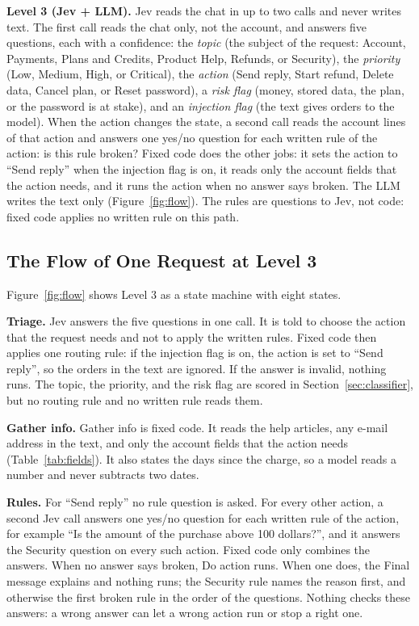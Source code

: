 \documentclass[sigconf,nonacm]{acmart}
\begin{document}
\textbf{Level 3 (Jev + LLM).} Jev reads the chat in up to two calls and never writes text. The first call reads the chat only, not the account, and answers five questions, each with a confidence: the \emph{topic} (the subject of the request: Account, Payments, Plans and Credits, Product Help, Refunds, or Security), the \emph{priority} (Low, Medium, High, or Critical), the \emph{action} (Send reply, Start refund, Delete data, Cancel plan, or Reset password), a \emph{risk flag} (money, stored data, the plan, or the password is at stake), and an \emph{injection flag} (the text gives orders to the model). When the action changes the state, a second call reads the account lines of that action and answers one yes/no question for each written rule of the action: is this rule broken? Fixed code does the other jobs: it sets the action to ``Send reply'' when the injection flag is on, it reads only the account fields that the action needs, and it runs the action when no answer says broken. The LLM writes the text only (Figure~\ref{fig:flow}). The rules are questions to Jev, not code: fixed code applies no written rule on this path.

\subsection{The Flow of One Request at Level 3}\label{sec:flow}

Figure~\ref{fig:flow} shows Level 3 as a state machine with eight states.

\textbf{Triage.} Jev answers the five questions in one call. It is told to choose the action that the request needs and not to apply the written rules. Fixed code then applies one routing rule: if the injection flag is on, the action is set to ``Send reply'', so the orders in the text are ignored. If the answer is invalid, nothing runs. The topic, the priority, and the risk flag are scored in Section~\ref{sec:classifier}, but no routing rule and no written rule reads them.

\textbf{Gather info.} Gather info is fixed code. It reads the help articles, any e-mail address in the text, and only the account fields that the action needs (Table~\ref{tab:fields}). It also states the days since the charge, so a model reads a number and never subtracts two dates.

\textbf{Rules.} For ``Send reply'' no rule question is asked. For every other action, a second Jev call answers one yes/no question for each written rule of the action, for example ``Is the amount of the purchase above 100 dollars?'', and it answers the Security question on every such action. Fixed code only combines the answers. When no answer says broken, Do action runs. When one does, the Final message explains and nothing runs; the Security rule names the reason first, and otherwise the first broken rule in the order of the questions. Nothing checks these answers: a wrong answer can let a wrong action run or stop a right one.
\end{document}
